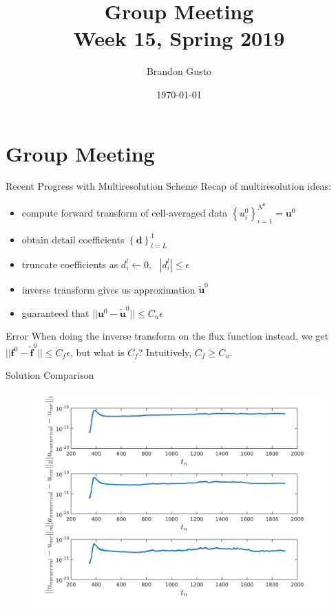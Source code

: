 \documentclass{beamer}
\newcommand{\weeknum}{15}
\begin{document}
\section{Group Meeting}
\title{Group Meeting \\ Week \weeknum, Spring 2019}
\author{Brandon Gusto} %
\date{\today}
\frame{\titlepage}

\begin{frame}{Recent Progress with Multiresolution Scheme}
  Recap of multiresolution ideas:
  \begin{itemize}
    \item<2-> compute forward transform of cell-averaged data $\left\{ u_{i}^{0} \right\}_{i=1}^{N^{0}} = \mathbf{u}^{0}$
    \item<3-> obtain detail coefficients $\left\{ \mathbf{d} \right\}_{l=L}^{1}$
    \item<4-> truncate coefficients as $d_{i}^{l} \leftarrow 0, \text{ } |d_{i}^{l}| \leq \epsilon$
    \item<5-> inverse transform gives us approximation $\tilde{ \mathbf{u} }^{0}$
    \item<6-> guaranteed that $|| \mathbf{u}^{0} - \tilde{\mathbf{u}}^{0} || \leq C_{u}  \epsilon$
  \end{itemize}
\end{frame}

\begin{frame}{Error}
  When doing the inverse transform on the flux function instead, we get $|| \mathbf{f}^{0} - \tilde{\mathbf{f}}^{0} || \leq C_{f} \epsilon$, but what is $C_{f}$? Intuitively, $C_{f} \geq C_{u}$.
\end{frame}

\begin{frame}{Solution Comparison}
  \begin{figure}
    \center
    \includegraphics[scale=0.48]{error_comparison.png}
  \end{figure}
\end{frame}
\end{document}
